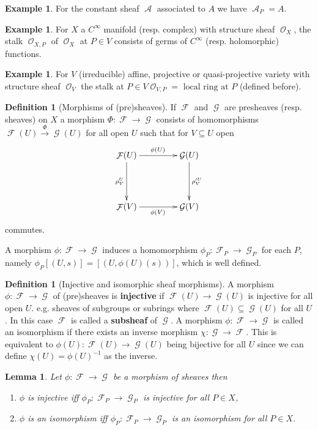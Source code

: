 \documentclass[10pt,]{book}
\newcommand{\terminology}[1]{\textbf{#1}}
\theoremstyle{plain}
\newtheorem{lemma}[theorem]{Lemma}
\theoremstyle{definition}
\newtheorem{definition}[theorem]{Definition}
\newtheorem{example}[theorem]{Example}
\DeclareMathOperator{\A}{\mathcal{A}}
\DeclareMathOperator{\F}{\mathcal{F}}
\DeclareMathOperator{\G}{\mathcal{G}}
\DeclareMathOperator{\cO}{\mathcal{O}}
\begin{document}
\begin{example}\label{example-4}
For the constant sheaf \(\A\) associated to \(A\) we have \(\A_P = A\).
          \end{example}
\begin{example}\label{example-5}
For \(X\) a \(C^\infty\) manifold (resp. complex) with structure sheaf \(\cO_X\), the stalk \(\cO_{X,P}\) of \(\cO_X\) at \(P\in V\) consists of germs of \(C^\infty\) (resp. holomorphic) functions.
          \end{example}
\begin{example}\label{example-6}
For \(V\) (irreducible) affine, projective or quasi-projective variety with structure sheaf \(\cO_V\) the stalk at \(P\in V\)\(\cO_{V,P} = \text{ local ring at } P\) (defined before).
          \end{example}
\begin{definition}[Morphisms of (pre)sheaves]\label{definition-4}
If \(\F\) and \(\G\) are presheaves (resp. sheaves) on \(X\) a morphism \(\Phi\colon \F \to \G\) consists of homomorphisms \(\F(U) \xrightarrow{\Phi} \G(U)\) for all open \(U\) such that for \(V \subseteq U\) open
            \[\xymatrix@R+2em@C+2em{
              \F(U) \ar[r]^{\phi(U)} \ar[d]_{\rho^U_V} & \G(U) \ar[d]^{\rho'^U_V} \\
              \F(V) \ar[r]_{\phi(V)} & \G(V)
              }
            \]
            commutes.
          \end{definition}
\par
A morphism \(\phi\colon \F \to \G\) induces a homomorphism \(\phi_P\colon \F_P \to \G_P\) for each \(P\), namely \(\phi_P[(U,s)] = [(U,\phi(U)(s))]\), which is well defined.%
\begin{definition}[Injective and isomorphic sheaf morphisms]\label{definition-5}
A morphism \(\phi\colon \F\to\G\) of (pre)sheaves is \terminology{injective} if \(\F(U) \to \G(U)\) is injective for all open \(U\).
            e.g. sheaves of subgroups or subrings where \(\F(U) \subseteq \G(U)\) for all \(U\).
            In this case \(\F\) is called a \terminology{subsheaf} of \(\G\).\newline{}
            A morphism \(\phi\colon \F \to \G\) is called an isomorphism if there exists an inverse morphism \(\chi\colon \G\to\F\).
            This is equivalent to \(\phi(U)\colon \F(U) \to \G(U)\) being bijective for all \(U\) since we can define \(\chi(U) = \phi(U)^{-1}\) as the inverse.
          \end{definition}
\begin{lemma}\label{lemma-1}
Let \(\phi\colon \F\to\G\) be a morphism of sheaves then
            \begin{enumerate}
\item{}\(\phi\) is injective iff \(\phi_P\colon \F_P \to \G_P\) is injective for all \(P\in X\),\item{}\(\phi\) is an isomorphism iff \(\phi_P\colon \F_P \to \G_P\) is an isomorphism for all \(P\in X\).\end{enumerate}
\end{lemma}
\end{document}
